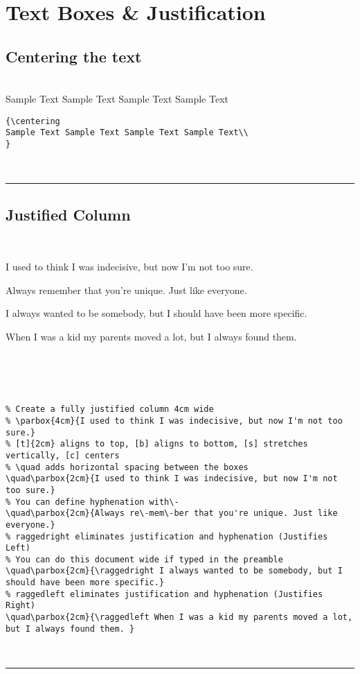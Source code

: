 \documentclass[a4paper,12pt,titlepage]{article}
\begin{document}
 
 
 
 
 \section{Text Boxes \& Justification}
 \subsection{Centering the text}
 ~\\
 {\centering
Sample Text Sample Text Sample Text Sample Text\\
}

\begin{lstlisting}  
{\centering
Sample Text Sample Text Sample Text Sample Text\\
}
\end{lstlisting}  
~\\
\rule{\linewidth}{0.1mm}

\subsection{Justified Column}
~\\
\quad\parbox{2cm}{I used to think I was indecisive, but now I'm not too sure.}
\quad\parbox{2cm}{Always re\-mem\-ber that you're unique. Just like everyone.}
\quad\parbox{2cm}{\raggedright I always wanted to be somebody, but I should have been more specific.}
\quad\parbox{2cm}{\raggedleft When I was a kid my parents moved a lot, but I always found them. }
~\\
\\
\\
\begin{minipage}{\linewidth}
\begin{lstlisting}  
% Create a fully justified column 4cm wide
% \parbox{4cm}{I used to think I was indecisive, but now I'm not too sure.}
% [t]{2cm} aligns to top, [b] aligns to bottom, [s] stretches vertically, [c] centers
% \quad adds horizontal spacing between the boxes
\quad\parbox{2cm}{I used to think I was indecisive, but now I'm not too sure.}
% You can define hyphenation with\-
\quad\parbox{2cm}{Always re\-mem\-ber that you're unique. Just like everyone.}
% raggedright eliminates justification and hyphenation (Justifies Left)
% You can do this document wide if typed in the preamble
\quad\parbox{2cm}{\raggedright I always wanted to be somebody, but I should have been more specific.}
% raggedleft eliminates justification and hyphenation (Justifies Right)
\quad\parbox{2cm}{\raggedleft When I was a kid my parents moved a lot, but I always found them. }
\end{lstlisting}  
\end{minipage}
~\\
\rule{\linewidth}{0.1mm}
\end{document}
